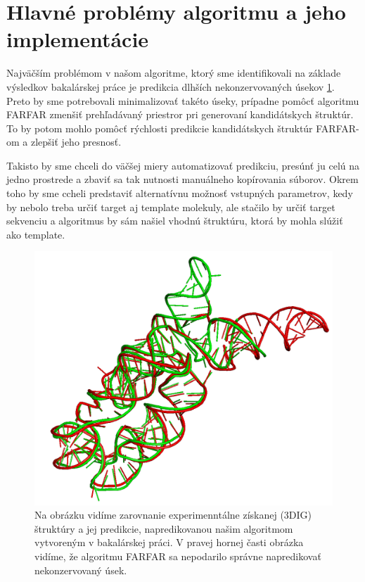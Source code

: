 \section{Hlavné problémy algoritmu a jeho implementácie}
Najväčším problémom v našom algoritme, ktorý sme identifikovali na základe výsledkov bakalárskej práce je predikcia dlhších nekonzervovaných úsekov \ref{obr3.3:badPredictedRegion}. Preto by sme potrebovali minimalizovať takéto úseky, prípadne pomôcť algoritmu FARFAR zmenšiť prehľadávaný priestror pri generovaní kandidátskych štruktúr. To by potom mohlo pomôcť rýchlosti predikcie kandidátskych štruktúr FARFAR-om a zlepšiť jeho presnosť.

\indent Takisto by sme chceli do väčšej miery automatizovať predikciu, presúnť ju celú na jedno prostrede a zbaviť sa tak nutnosti manuálneho kopírovania súborov. Okrem toho by sme ccheli predstaviť alternatívnu možnosť vstupných parametrov, kedy by nebolo treba určiť target aj template molekuly, ale stačilo by určiť target sekvenciu a algoritmus by sám našiel vhodnú štruktúru, ktorá by mohla slúžiť ako template. 

\begin{figure}%
\includegraphics[width=\textwidth]{../img/badPredictedRegion}
\caption{Na obrázku vidíme zarovnanie experimenntálne získanej (3DIG) štruktúry a jej predikcie, napredikovanou našim algoritmom vytvoreným v bakalárskej práci. V pravej hornej časti obrázka vidíme, že algoritmu FARFAR sa nepodarilo správne napredikovať nekonzervovaný úsek.}
\label{obr3.3:badPredictedRegion}
\end{figure}
